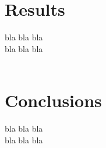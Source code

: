 \documentclass[10pt,conference,compsocconf]{IEEEtran}
\begin{document}
\section{Results}

bla bla bla\\
bla bla bla\\
~\cite{higgs}

\section{Conclusions}

bla bla bla\\
bla bla bla\\





\end{document}
